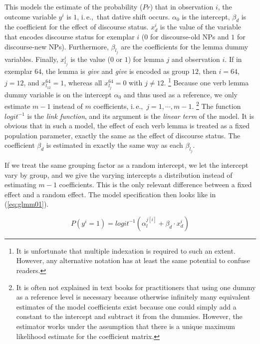 \documentclass[a4paper,12pt]{article}
\newcommand{\ie}{i.\,e.,\ }
\begin{document}
This models the estimate of the probability ($Pr$) that in observation $i$, the outcome variable $y^i$ is $1$, \ie that dative shift occurs.
$\alpha_0$ is the intercept, $\beta_d$ is the coefficient for the effect of discourse status.
$x_d^i$ is the value of the variable that encodes discourse status for exemplar $i$ ($0$ for discourse-old NPs and $1$ for discourse-new NPs).
Furthermore, $\beta_{l_j}$ are the coefficients for the lemma dummy variables.
Finally, $x_{l_j}^i$ is the value ($0$ or $1$) for lemma $j$ and observation $i$.
If in exemplar $64$, the lemma is \textit{give} and \textit{give} is encoded as group $12$, then $i=64$, $j=12$, and $x_{l_{12}}^{64}=1$, whereas all $x_{l_j}^{64}=0$ with $j\neq12$.%
\footnote{It is unfortunate that multiple indexation is required to such an extent.
However, any alternative notation has at least the same potential to confuse readers.}
Because one verb lemma dummy variable is on the intercept $\alpha_0$ and thus used as a reference, we only estimate $m-1$ instead of $m$ coefficients, \ie $j=1,\cdots,m-1$.%
\footnote{It is often not explained in text books for practitioners that using one dummy as a reference level is necessary because otherwise infinitely many equivalent estimates of the model coefficients exist because one could simply add a constant to the intercept and subtract it from the dummies.
However, the estimator works under the assumption that there is a unique maximum likelihood estimate for the coefficient matrix.}
The function $logit^{-1}$ is the \textit{link function}, and its argument is the \textit{linear term} of the model.
It is obvious that in such a model, the effect of each verb lemma is treated as a fixed population parameter, exactly the same as the effect of discourse status.
The coefficient $\beta_d$ is estimated in exactly the same way as each $\beta_{l_j}$.

If we treat the same grouping factor as a random intercept, we let the intercept vary by group, and we give the varying intercepts a distribution instead of estimating $m-1$ coefficients.
This is the only relevant difference between a fixed effect and a random effect.
The model specification then looks like in (\ref{eq:glmm01}).

\begin{equation}
  P(y^i=1)=logit^{-1}(\alpha_{l}^{j[i]}+\beta_d\cdot x_d^i)
  \label{eq:glmm01}
\end{equation}
\end{document}
